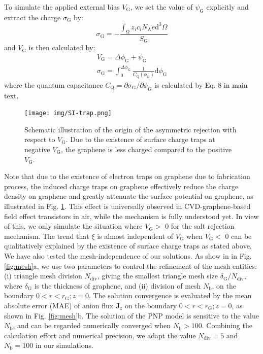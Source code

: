 \documentclass[journal=langd5,email=true, hyperref=true, keywords=false]{achemso}
\begin{document}
To simulate the applied external bias $V_{\mathrm{G}}$, we set the
value of $\psi_{\mathrm{G}}$ explicitly and extract the charge
$\sigma_{\mathrm{G}}$ by:
\begin{equation}
  \label{eq:sigma-G}
  \sigma_{\mathrm{G}} = - {\displaystyle \frac{\int_{\mathrm{\Omega}} z_{i} c_{i} N_{\mathrm{A}} e \mathrm{d}^{3} \Omega}{S_{\mathrm{G}}}}
\end{equation}
and $V_{\mathrm{G}}$ is then calculated by:
\begin{eqnarray}
  \label{eq:VG}
  V_{\mathrm{G}} = \Delta \phi_{\mathrm{G}} + \psi_{\mathrm{G}}\\
  \sigma_{\mathrm{G}} = \int_{0}^{\Delta \phi_{\mathrm{G}}} \frac{1}{C_{\mathrm{Q}}(\phi_{\mathrm{G}})} \mathrm{d} \phi_{\mathrm{G}}
\end{eqnarray}
where the quantum capacitance
$C_{\mathrm{Q}}=\partial \sigma_{\mathrm{G}}/\partial
\phi_{\mathrm{G}}$ is calculated by Eq. 8 in main text.

\begin{figure}[htbp]
  \centering
  \texttt{[image: img/SI-trap.png]}
  \caption{Schematic illustration of the origin of the asymmetric
    rejection with respect to $V_{\mathrm{G}}$. Due to the
    existence of surface charge traps at negative $V_{\mathrm{G}}$,
    the graphene is less charged compared to the positive
    $V_{\mathrm{G}}$.}
  \label{fig:trap}
\end{figure}

Note that due to the existence of electron traps on graphene due to
fabrication process, the induced charge traps on graphene effectively
reduce the charge density on graphene and greatly attenuate the
surface potential on graphene, as illustrated in Fig. \ref{fig:trap}. This effect is universally observed in
CVD-graphene-based field effect transistors in air, while the
mechanism is fully understood yet. In view of this, we only simulate
the situation where $V_{\mathrm{G}}>$ 0 for the salt rejection
mechanism. The trend that $\xi$ is almost independent of
$V_{\mathrm{G}}$ when $V_{\mathrm{G}}<$ 0 can be qualitatively
explained by the existence of surface charge traps as stated above.
We have also tested the mesh-independence of our solutions. As show in
in Fig. \ref{fig:mesh}a, we use two parameters to control the
refinement of the mesh entities: (i) triangle mesh division
$N_{\mathrm{div}}$, giving the smallest triangle mesh size
$\delta_{\mathrm{G}} / N_{\mathrm{div}}$, where $\delta_{\mathrm{G}}$
is the thickness of graphene, and (ii) division of mesh
$N_{\mathrm{b}}$, on the boundary $0<r<r_{\mathrm{G}};z=0$. The
solution convergence is evaluated by the mean absolute error (MAE) of
anion flux $\boldsymbol{J}_{z}$ on the boundary
$0<r<r_{\mathrm{G}};z=0$, as shown in Fig.
\ref{fig:mesh}b. The solution of the PNP model is sensitive to the
value $N_{\mathrm{b}}$, and can be regarded numerically converged when
$N_{\mathrm{b}}>100$. Combining the calculation effort and numerical
precision, we adapt the value $N_{\mathrm{div}}=5$ and
$N_{\mathrm{b}}=100$ in our simulations.
\end{document}
